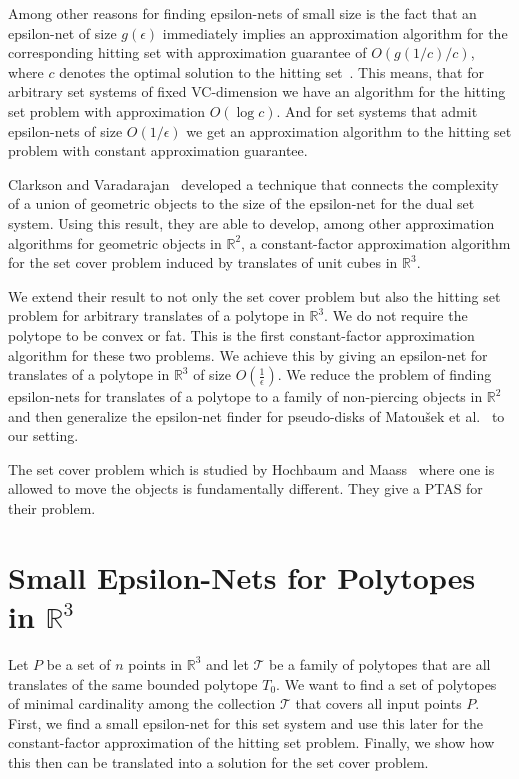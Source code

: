 \documentclass{stacs_proc}
\newcommand{\bigO}{O}
\newcommand{\setR}{\mathbb{R}}
\newcommand{\T}{\mathcal{T}}
\begin{document}
Among other reasons for finding epsilon-nets of small size is the fact
that an epsilon-net of size $g(\epsilon)$ immediately implies an
approximation algorithm for the corresponding hitting set with
approximation guarantee of $\bigO(g(1/c)/c)$, where $c$ denotes the
optimal solution to the hitting set~\cite{PA95}. This means, that for
arbitrary set systems of fixed VC-dimension we have an algorithm for
the hitting set problem with approximation $\bigO(\log c)$.  
And for set systems that admit epsilon-nets of size $\bigO(1/ \epsilon)$ we
get an approximation algorithm to the hitting set problem with
constant approximation guarantee.    




Clarkson and Varadarajan~\cite{CV05} developed a technique that
connects the complexity of a union of geometric objects to the size of
the epsilon-net for the dual set system. Using this result, they are
able to develop, among other approximation algorithms for geometric
objects in $\setR^2$, a constant-factor approximation algorithm for the
set cover problem induced by translates of unit cubes in $\setR^3$.  

We extend their result to not only the set cover problem but also the
hitting set problem for arbitrary translates of a polytope in
$\setR^3$. We do not require the polytope to be convex or fat. This is the
first constant-factor approximation algorithm for these two
problems. We achieve this by giving an epsilon-net for translates of a
polytope in $\setR^3$ of size $\bigO(\frac{1}{\epsilon})$. We reduce the problem
of finding epsilon-nets for translates of a polytope to a family of
non-piercing objects in $\setR^2$ and then generalize the epsilon-net
finder for pseudo-disks of Matou\v{s}ek et al.~\cite{MSW90} to our
setting.     

The set cover problem
which is studied by Hochbaum and Maass~\cite{HM85} where one is
allowed to move the objects is fundamentally different. They give a
PTAS for their problem.  






\section{Small Epsilon-Nets for Polytopes in $\setR^3$}



Let $P$ be a set of $n$ points in $\setR^3$ and let $\T$ be a family of
polytopes  that are all translates of the same bounded polytope
$T_0$.
We want to find a set of polytopes of minimal cardinality among the
collection $\T$ that covers all input points $P$. 
First, we find a small epsilon-net for this set system and use this
later for the constant-factor approximation of the hitting set
problem. Finally, we show how this then can be translated into a
solution for the set cover problem.  
\end{document}

